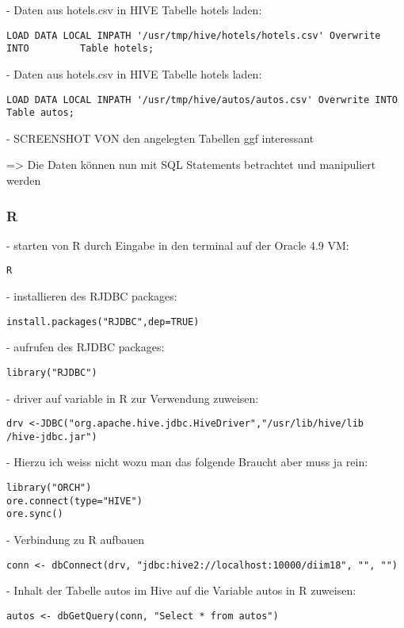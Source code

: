 - Daten aus hotels.csv in HIVE Tabelle hotels laden:
\begin{lstlisting}
LOAD DATA LOCAL INPATH '/usr/tmp/hive/hotels/hotels.csv' Overwrite INTO         Table hotels;
\end{lstlisting}

- Daten aus hotels.csv in HIVE Tabelle hotels laden:
\begin{lstlisting}
LOAD DATA LOCAL INPATH '/usr/tmp/hive/autos/autos.csv' Overwrite INTO   Table autos;
\end{lstlisting}
- SCREENSHOT VON den angelegten Tabellen ggf interessant

=> Die Daten können nun mit SQL Statements betrachtet und manipuliert werden

\subsubsection{R}

- starten von R durch Eingabe in den terminal auf der Oracle 4.9 VM:
\begin{lstlisting}
R
\end{lstlisting}

- installieren des RJDBC packages:
\begin{lstlisting}
install.packages("RJDBC",dep=TRUE)
\end{lstlisting}

- aufrufen des RJDBC packages:
\begin{lstlisting}
library("RJDBC")
\end{lstlisting}

- driver auf variable in R zur Verwendung zuweisen:
\begin{lstlisting}
drv <-JDBC("org.apache.hive.jdbc.HiveDriver","/usr/lib/hive/lib         /hive-jdbc.jar")
\end{lstlisting}

- Hierzu ich weiss nicht wozu man das folgende Braucht aber muss ja rein:

\begin{lstlisting}
library("ORCH")
ore.connect(type="HIVE")
ore.sync()
\end{lstlisting}

- Verbindung zu R aufbauen
\begin{lstlisting}
conn <- dbConnect(drv, "jdbc:hive2://localhost:10000/diim18", "", "")
\end{lstlisting}

- Inhalt der Tabelle autos im Hive auf die Variable autos in R zuweisen:
\begin{lstlisting}
autos <- dbGetQuery(conn, "Select * from autos")
\end{lstlisting}

